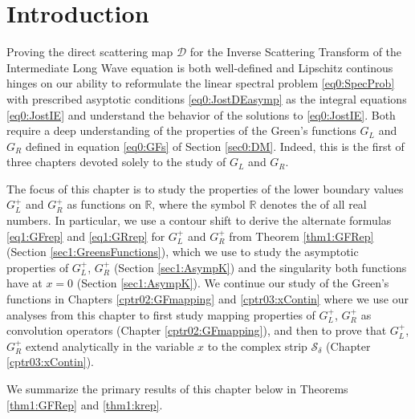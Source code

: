 \documentclass[../dissertation.tex]{subfiles}
\begin{document}
\setcounter{section}{-1}
\section{Introduction}\label{sec1:Intro}

Proving the direct scattering map $\mathscr D$ for the Inverse Scattering Transform
of the Intermediate Long Wave equation is both well-defined and Lipschitz 
continous hinges on our ability to reformulate the linear spectral problem 
\eqref{eq0:SpecProb} with prescribed asyptotic conditions \eqref{eq0:JostDEasymp}
as the integral equations \eqref{eq0:JostIE} and understand the behavior of 
the solutions to \eqref{eq0:JostIE}. Both require a deep understanding of
the properties of the Green's functions $G_L$ and $G_R$ defined in equation
\eqref{eq0:GFs} of Section \ref{sec0:DM}. Indeed, this is the first of three
chapters devoted solely to the study of $G_L$ and $G_R$.


The focus of this chapter is to study the properties 
of the lower boundary values $G_L^+$ and $G_R^+$ as functions on $\mathbb R$, 
where the symbol $\mathbb R$ denotes the of all real numbers.\label{sym:Reals}
In particular, we use a contour shift to derive the alternate formulas
\eqref{eq1:GFrep} and \eqref{eq1:GRrep} for $G_L^+$ and $G_R^+$ from 
Theorem \ref{thm1:GFRep} (Section \ref{sec1:GreensFunctions}), which
we use to study the asymptotic properties of $G_L^+$, 
$G_R^+$ (Section \ref{sec1:AsympK}) and the singularity both functions have 
at $x=0$ (Section \ref{sec1:AsympK}). We continue our study of the Green's
functions in Chapters \ref{cptr02:GFmapping} and \ref{cptr03:xContin} 
where we use our analyses from this chapter 
to first study mapping properties of $G_L^+$, $G_R^+$ as convolution operators 
(Chapter \ref{cptr02:GFmapping}), and then to prove that $G_L^+$, $G_R^+$
extend analytically in the variable $x$ to the complex strip $\mathcal S_\delta$
(Chapter \ref{cptr03:xContin}).

We summarize the primary results of this chapter below in Theorems
\ref{thm1:GFRep} and \ref{thm1:krep}.
\end{document}
